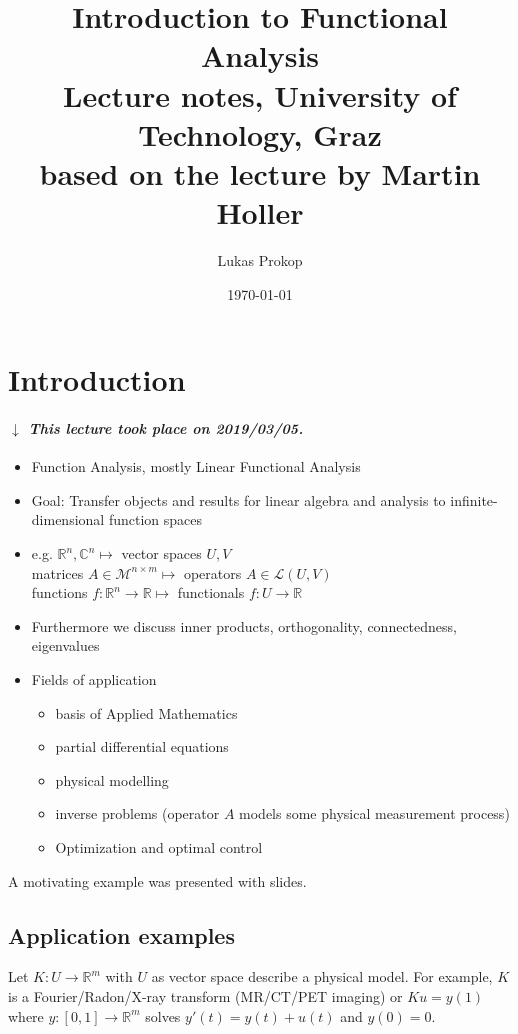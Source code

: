 \documentclass{article}
\title{
  Introduction to Functional Analysis \\
  \large{Lecture notes, University of Technology, Graz} \\
  based on the lecture by Martin Holler
}
\date{\today}
\author{Lukas Prokop}
\numberwithin{lecref}{section}
\newcommand{\dateref}[1]{%
  \begin{mdframed}[backgroundcolor=gray!10,innerbottommargin=0pt,innertopmargin=0pt]
    \paragraph{\textit{$\downarrow$ This lecture took place on #1.}}%
  \end{mdframed}%
}
\begin{document}
\maketitle
\tableofcontents

\section{Introduction}

\dateref{2019/03/05}

\begin{itemize}
	\item Function Analysis, mostly Linear Functional Analysis
	\item Goal: Transfer objects and results for linear algebra and analysis to infinite-dimensional function spaces
	\item e.g. $\mathbb R^n, \mathbb C^n \mapsto$ vector spaces $U, V$ \\
		matrices $A \in \mathcal M^{n \times m} \mapsto$ operators $A \in \mathcal L(U, V)$ \\
		functions $f: \mathbb R^n \to \mathbb R \mapsto$ functionals $f: U \to \mathbb R$
	\item Furthermore we discuss inner products, orthogonality, connectedness, eigenvalues
	\item Fields of application
	  \begin{itemize}
	  	\item basis of Applied Mathematics
	  	\item partial differential equations
	  	\item physical modelling
	  	\item inverse problems (operator $A$ models some physical measurement process)
	  	\item Optimization and optimal control
	  \end{itemize}
\end{itemize}

A motivating example was presented with slides.

\subsection{Application examples}

Let $K: U \to \mathbb R^m$ with $U$ as vector space describe a physical model.
For example, $K$ is a Fourier/Radon/X-ray transform (MR/CT/PET imaging) or
$K u = y(1)$ where $y: [0, 1] \to \mathbb R^m$ solves $y'(t) = y(t) + u(t)$ and $y(0) = 0$.
\end{document}
